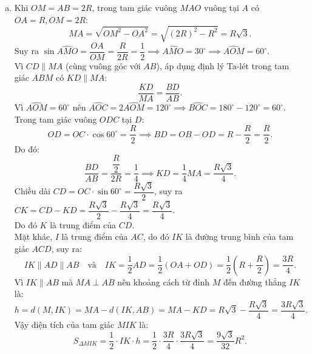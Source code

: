 \begin{bt}
{\begin{enumerate}[a)]
	Trong tam giác vuông $MCO$ vuông tại $C$ có đường cao $CI \perp MO$, áp dụng hệ thức lượng ta có:
	$$ MC^2 = MI \cdot MO. $$
	\item Khi $OM = AB = 2R$, trong tam giác vuông $MAO$ vuông tại $A$ có $OA = R, OM = 2R$:
	$$ MA = \sqrt{OM^2 - OA^2} = \sqrt{(2R)^2 - R^2} = R\sqrt{3}. $$
	Suy ra $\sin \widehat{AMO} = \dfrac{OA}{OM} = \dfrac{R}{2R} = \dfrac{1}{2} \implies \widehat{AMO} = 30^\circ \implies \widehat{AOM} = 60^\circ$.\\
	Vì $CD \parallel MA$ (cùng vuông góc với $AB$), áp dụng định lý Ta-lét trong tam giác $ABM$ có $KD \parallel MA$:
	$$ \dfrac{KD}{MA} = \dfrac{BD}{AB}. $$
	Vì $\widehat{AOM} = 60^\circ$ nên $\widehat{AOC} = 2\widehat{AOM} = 120^\circ \implies \widehat{BOC} = 180^\circ - 120^\circ = 60^\circ$.\\
	Trong tam giác vuông $ODC$ tại $D$:
	$$ OD = OC \cdot \cos 60^\circ = \dfrac{R}{2} \implies BD = OB - OD = R - \dfrac{R}{2} = \dfrac{R}{2}. $$
	Do đó:
	$$ \dfrac{BD}{AB} = \dfrac{\dfrac{R}{2}}{2R} = \dfrac{1}{4} \implies KD = \dfrac{1}{4}MA = \dfrac{R\sqrt{3}}{4}. $$
	Chiều dài $CD = OC \cdot \sin 60^\circ = \dfrac{R\sqrt{3}}{2}$, suy ra $CK = CD - KD = \dfrac{R\sqrt{3}}{2} - \dfrac{R\sqrt{3}}{4} = \dfrac{R\sqrt{3}}{4}$.\\
	Do đó $K$ là trung điểm của $CD$.\\
	Mặt khác, $I$ là trung điểm của $AC$, do đó $IK$ là đường trung bình của tam giác $ACD$, suy ra:
	$$ IK \parallel AD \parallel AB \quad \text{và} \quad IK = \dfrac{1}{2}AD = \dfrac{1}{2}(OA + OD) = \dfrac{1}{2}\left(R + \dfrac{R}{2}\right) = \dfrac{3R}{4}. $$
	Vì $IK \parallel AB$ mà $MA \perp AB$ nên khoảng cách từ đỉnh $M$ đến đường thẳng $IK$ là:
	$$ h = d(M, IK) = MA - d(IK, AB) = MA - KD = R\sqrt{3} - \dfrac{R\sqrt{3}}{4} = \dfrac{3R\sqrt{3}}{4}. $$
	Vậy diện tích của tam giác $MIK$ là:
	$$ S_{\Delta MIK} = \dfrac{1}{2} \cdot IK \cdot h = \dfrac{1}{2} \cdot \dfrac{3R}{4} \cdot \dfrac{3R\sqrt{3}}{4} = \dfrac{9\sqrt{3}}{32}R^2. $$
\end{enumerate}
}
\end{bt}

